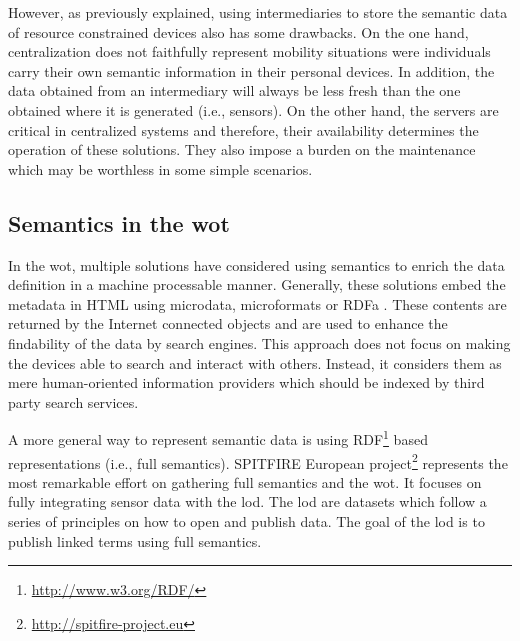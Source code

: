 However, as previously explained, using intermediaries to store the semantic data of resource constrained devices also has some drawbacks.
On the one hand, centralization does not faithfully represent mobility situations were individuals carry their own semantic information in their personal devices.
In addition, the data obtained from an intermediary will always be less fresh than the one obtained where it is generated (i.e., sensors).
On the other hand, the servers are critical in centralized systems and therefore, their availability determines the operation of these solutions.
They also impose a burden on the maintenance which may be worthless in some simple scenarios.


\subsection{Semantics in the \acl{wot}}
In the \acl{wot}, multiple solutions have considered using semantics to enrich the data definition in a machine processable manner.
Generally, these solutions embed the metadata in HTML using microdata, microformats or RDFa \citep{mayer_extensible_2011}.
These contents are returned by the Internet connected objects and are used to enhance the findability of the data by search engines.
This approach does not focus on making the devices able to search and interact with others.
Instead, it considers them as mere human-oriented information providers which should be indexed by third party search services.

A more general way to represent semantic data is using RDF\footnote{\url{http://www.w3.org/RDF/}} based representations (i.e., full semantics).
SPITFIRE European project\footnote{\url{http://spitfire-project.eu}} represents the most remarkable effort on gathering full semantics and the \ac{wot}.
It focuses on fully integrating sensor data with the \ac{lod}.
The \ac{lod} are datasets which follow a series of principles on how to open and publish data.
The goal of the \ac{lod} is to publish linked terms using full semantics.

